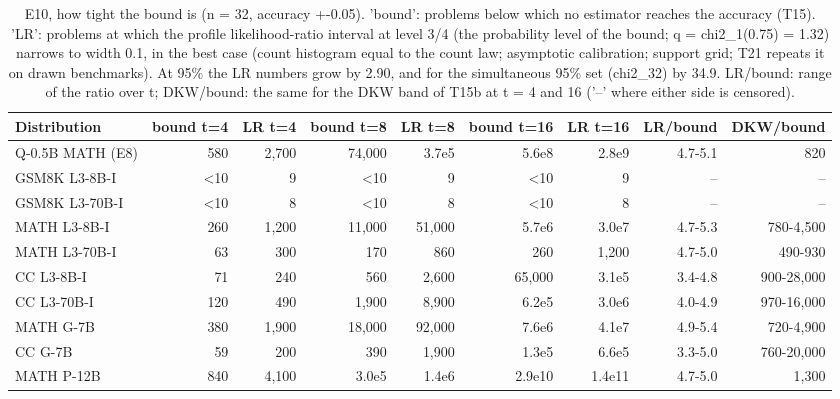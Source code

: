 \begin{table}[t]
\centering
\small
\begin{tabular}{lrrrrrrrr}
\toprule
Distribution & bound t=4 & LR t=4 & bound t=8 & LR t=8 & bound t=16 & LR t=16 & LR/bound & DKW/bound \\
\midrule
Q-0.5B MATH (E8) & 580 & 2,700 & 74,000 & 3.7e5 & 5.6e8 & 2.8e9 & 4.7-5.1 & 820 \\
GSM8K L3-8B-I & <10 & 9 & <10 & 9 & <10 & 9 & -- & -- \\
GSM8K L3-70B-I & <10 & 8 & <10 & 8 & <10 & 8 & -- & -- \\
MATH L3-8B-I & 260 & 1,200 & 11,000 & 51,000 & 5.7e6 & 3.0e7 & 4.7-5.3 & 780-4,500 \\
MATH L3-70B-I & 63 & 300 & 170 & 860 & 260 & 1,200 & 4.7-5.0 & 490-930 \\
CC L3-8B-I & 71 & 240 & 560 & 2,600 & 65,000 & 3.1e5 & 3.4-4.8 & 900-28,000 \\
CC L3-70B-I & 120 & 490 & 1,900 & 8,900 & 6.2e5 & 3.0e6 & 4.0-4.9 & 970-16,000 \\
MATH G-7B & 380 & 1,900 & 18,000 & 92,000 & 7.6e6 & 4.1e7 & 4.9-5.4 & 720-4,900 \\
CC G-7B & 59 & 200 & 390 & 1,900 & 1.3e5 & 6.6e5 & 3.3-5.0 & 760-20,000 \\
MATH P-12B & 840 & 4,100 & 3.0e5 & 1.4e6 & 2.9e10 & 1.4e11 & 4.7-5.0 & 1,300 \\
\bottomrule
\end{tabular}
\caption{E10, how tight the bound is (n = 32, accuracy +-0.05). 'bound': problems below which no estimator reaches the accuracy (T15). 'LR': problems at which the profile likelihood-ratio interval at level 3/4 (the probability level of the bound; q = chi2\_1(0.75) = 1.32) narrows to width 0.1, in the best case (count histogram equal to the count law; asymptotic calibration; support grid; T21 repeats it on drawn benchmarks). At 95\% the LR numbers grow by 2.90, and for the simultaneous 95\% set (chi2\_32) by 34.9. LR/bound: range of the ratio over t; DKW/bound: the same for the DKW band of T15b at t = 4 and 16 ('--' where either side is censored).}
\label{tab:T17_upper_vs_lower_bound}
\end{table}
